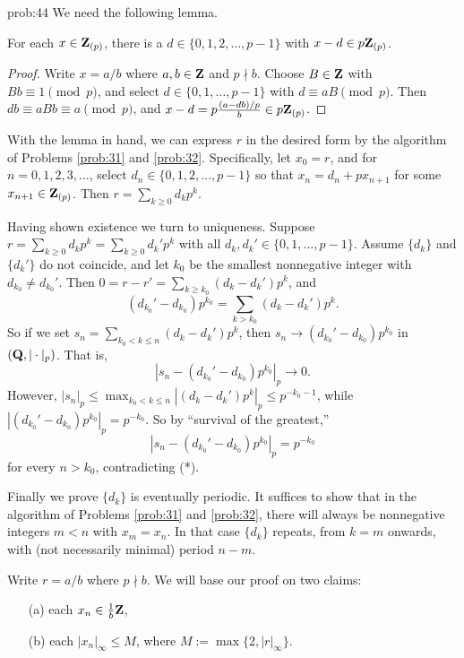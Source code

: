 \begin{sol}{prob:44} We need the following lemma.

\begin{lem} For each $x \in \mathbf{Z}_{(p)}$, there is a $d \in \{0,1,2,\dots,p-1\}$ with $x-d \in p\mathbf{Z}_{(p)}$.
\end{lem}
\begin{proof} Write $x=a/b$ where $a, b \in \mathbf{Z}$ and $p\nmid b$. Choose $B\in \mathbf{Z}$ with $Bb\equiv 1\pmod{p}$, and select $d\in \{0,1,\dots,p-1\}$ with $d\equiv aB\pmod{p}$. Then $db \equiv aBb\equiv a\pmod{p}$, and $x-d = p \frac{(a-db)/p}{b} \in p\mathbf{Z}_{(p)}$. 
\end{proof}

With the lemma in hand, we can express $r$ in the desired form by the algorithm of Problems \ref{prob:31} and \ref{prob:32}. Specifically, let $x_0 = r$, and for $n=0,1,2,3,\dots$, select $d_n \in \{0,1,2,\dots,p-1\}$ so that $x_n = d_n + p x_{n+1}$ for some $x_{n+1} \in \mathbf{Z}_{(p)}$. Then $r = \sum_{k\ge 0} d_k p^k$. 

Having shown existence we turn to uniqueness. Suppose $r =  \sum_{k\ge 0} d_k p^k = \sum_{k\ge 0} d_k' p^k$ with all $d_k, d_k' \in \{0,1,\dots,p-1\}$. Assume $\{d_k\}$ and $\{d_k'\}$ do not coincide, and let $k_0$ be the smallest nonnegative integer with $d_{k_0} \ne d_{k_0}'$. Then $0 = r-r' = \sum_{k\ge k_0} (d_k - d_k') p^k$, and 
\[ (d_{k_0}' -d_{k_0}) p^{k_0}= \sum_{k > k_0} (d_k - d_k') p^k.\]
So if we set $s_n = \sum_{k_0 < k \le n} (d_k-d_k')p^k$, then $s_n \to (d_{k_0}' -d_{k_0}) p^{k_0}$ in $(\mathbf{Q},|\cdot|_{p})$. That is,
\begin{equation}\tag{*} |s_n - (d_{k_0}' -d_{k_0}) p^{k_0}|_p \to 0.\end{equation} However, $|s_n|_p \le \max_{k_0 < k \le n} |(d_k-d_k')p^k|_p \le p^{-k_0-1}$, while $|(d_{k_0}' -d_{k_0}) p^{k_0}|_p = p^{-k_0}$. So by ``survival of the greatest,'' 
\[ |s_n - (d_{k_0}' -d_{k_0}) p^{k_0}|_p = p^{-k_0} \]
for every $n > k_0$, contradicting (*).

Finally we prove $\{d_k\}$ is eventually periodic. It suffices to show that in the algorithm of Problems \ref{prob:31} and \ref{prob:32}, there will always be  nonnegative integers $m < n$ with $x_{m} = x_{n}$. In that case $\{d_k\}$ repeats, from $k=m$ onwards, with (not necessarily minimal) period $n-m$.

Write $r=a/b$ where $p\nmid b$. We will base our proof on two claims:
\begin{enumerate}
\item[(a)] each $x_n \in \frac{1}{b}\mathbf{Z}$,
\item[(b)] each $|x_n|_{\infty}\le M$, where $M:= \max\{2,|r|_{\infty}\}$.
\end{enumerate}


\end{sol}

